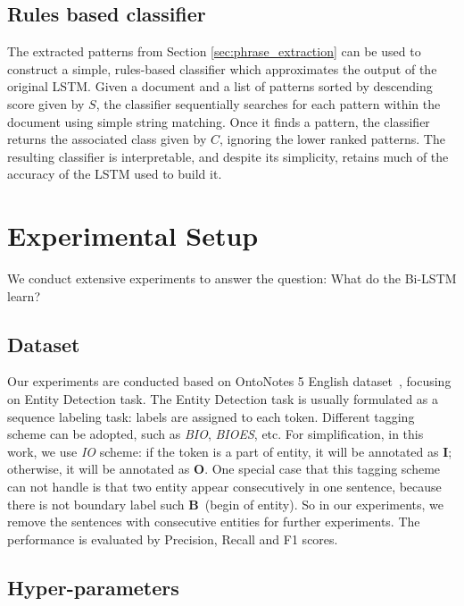 \documentclass{article}
\begin{document}
\subsection{Rules based classifier}

The extracted patterns from Section \ref{sec:phrase_extraction} can be used to construct a simple, rules-based classifier which approximates the output of the original LSTM. Given a document and a list of patterns sorted by descending score given by $S$, the classifier sequentially searches for each pattern within the document using simple string matching. Once it finds a pattern, the classifier returns the associated class given by $C$, ignoring the lower ranked patterns. The resulting classifier is interpretable,  and despite its simplicity,  retains much of the accuracy of the LSTM used to build it.



\section{Experimental Setup}

We conduct extensive experiments to answer the question: What do the Bi-LSTM learn? 


\subsection{Dataset} Our experiments are conducted based on OntoNotes 5 English dataset~\cite{weischedel2012ontonotes}, focusing on Entity Detection task. The Entity Detection task is usually formulated as a sequence labeling task: labels are assigned to each token. Different tagging scheme can be adopted, such as \textit{BIO}, \textit{BIOES}, etc. For simplification, in this work, we use \textit{IO} scheme: if the token is a part of entity, it will be annotated as \textbf{I}; otherwise, it will be annotated as \textbf{O}. One special case that this tagging scheme can not handle is that two entity appear consecutively in one sentence, because there is not boundary label such \textbf{B}~(begin of entity). So in our experiments, we remove the sentences with consecutive entities for further experiments. The performance is evaluated by Precision, Recall and F1 scores.

\subsection{Hyper-parameters}
\end{document}
